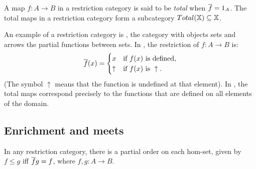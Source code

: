 A map $f:A\to B$ in a restriction category is said to be \emph{total} when
$\overline{f} = 1_A$. The total maps in a restriction category form a subcategory
$Total(\mathbb{X}) \subseteq \mathbb{X}$.

An example of a restriction category is \Par, the category with objects sets and arrows the
partial functions between sets. In \Par, the restriction of $f:A\to B$ is:
\[
  \overline{f}(x) =
  \begin{cases}
    x&\text{if $f(x)$ is defined,}\\
    \uparrow&\text{if }f(x)\text{ is }\uparrow.
  \end{cases}
\]
(The symbol $\uparrow$ means that the function is undefined at that element). In \Par, the
total maps correspond precisely to the functions that are defined on all elements of the domain.


\subsection{Enrichment and meets} %
\label{sub:enrichment_and_meets}


In any restriction category, there is a partial order on each hom-set, given by $f \le g$ iff
$\overline{f} g = f$, where $f,g:A\to B$.


